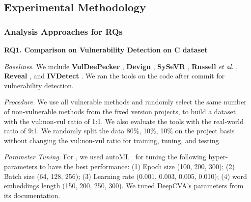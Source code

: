 \subsection{Experimental Methodology}
\label{method:sec}





\subsubsection{\textbf{Analysis Approaches for RQs\\}}

\noindent\textbf{RQ1. Comparison on Vulnerability Detection on C dataset}

\emph{Baselines}. We include
\textbf{VulDeePecker} \cite{li2018vuldeepecker}, \textbf{Devign}
\cite{zhou2019devign}, \textbf{SySeVR} \cite{li2021sysevr},
\textbf{Russell} {\em et al.}  \cite{russell2018automated},
\textbf{Reveal} \cite{chakraborty2021deep}, and {\bf IVDetect}
\cite{li2021vulnerability}. We ran the tools on the code after commit for
vulnerability detection.

\emph{Procedure.}  We use all vulnerable methods and randomly select
the same number of non-vulnerable methods from the fixed version
projects, to build a dataset with the vul:non-vul ratio of 1:1. We
also evaluate the tools with the real-world ratio of 9:1. We randomly split the
data 80\%, 10\%, 10\% on the project basis without changing the
vul:non-vul ratio for training, tuning, and testing.

\emph{Parameter Tuning.}  For {\tool}, we used
autoML~\cite{NNI} for tuning the following hyper-parameters to have the
best performance: (1) Epoch size (100, 200, 300); (2) Batch size (64,
128, 256); (3) Learning rate (0.001, 0.003, 0.005, 0.010); (4) word embeddings length (150, 200, 250, 300). We
tuned DeepCVA's parameters from its documentation.

